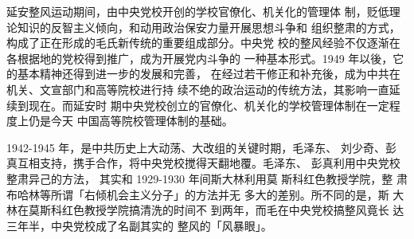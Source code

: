 延安整风运动期间，由中央党校开创的学校官僚化、机关化的管理体
制，贬低理论知识的反智主义倾向，和动用政治保安力量开展思想斗争和
组织整肃的方式，构成了正在形成的毛氏新传统的重要组成部分。中央党
校的整风经验不仅逐渐在各根据地的党校得到推广，成为开展党内斗争的
一种基本形式。1949 年以後，它的基本精神还得到进一步的发展和完善，
在经过若干修正和补充後，成为中共在机关、文宣部门和高等院校进行持
续不绝的政治运动的传统方法，其影响一直延续到现在。而延安时
期中央党校创立的官僚化、机关化的学校管理体制在一定程度上仍是今天
中国高等院校管理体制的基础。

1942-1945 年，是中共历史上大动荡、大改组的关键时期，毛泽东、 刘少奇、彭
真互相支持，携手合作，将中央党校搅得天翻地覆。毛泽东、 彭真利用中央党校
整肃异己的方法， 其实和 1929-1930 年间斯大林利用莫 斯科红色教授学院，整
肃布哈林等所谓「右倾机会主义分子」的方法并无 多大的差别。所不同的是，斯
大林在莫斯科红色教授学院搞清洗的时间不 到两年，而毛在中央党校搞整风竟长
达三年半，中央党校成了名副其实的 整风的「风暴眼」。
